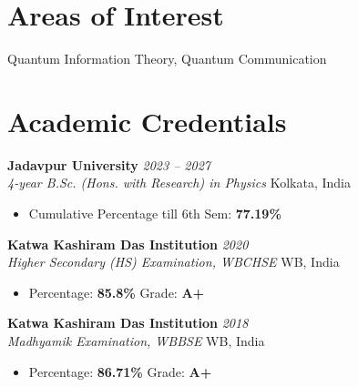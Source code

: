 \documentclass[11pt,a4paper]{article}
\newcommand{\entry}[4]{
    \textbf{#1} \hfill \textit{#2}\\
    \textit{#3} \hfill #4
    \vspace{3pt}
}
\begin{document}

\section{Areas of Interest}

Quantum Information Theory, Quantum Communication



\section{Academic Credentials}

\entry
{Jadavpur University}
{2023 -- 2027}
{4-year B.Sc. (Hons. with Research) in Physics}
{Kolkata, India}

\begin{itemize}
    \item Cumulative Percentage till 6th Sem: \textbf{77.19\%} \hspace{5pt}
\end{itemize}

\vspace{2pt}

\entry
{Katwa Kashiram Das Institution}
{2020}
{Higher Secondary (HS) Examination, WBCHSE}
{WB, India}

\begin{itemize}
    \item Percentage: \textbf{85.8\%} \hspace{5pt} Grade: \textbf{A+}
\end{itemize}

\vspace{2pt}

\entry
{Katwa Kashiram Das Institution}
{2018}
{Madhyamik Examination, WBBSE}
{WB, India}

\begin{itemize}
    \item Percentage: \textbf{86.71\%} \hspace{5pt} Grade: \textbf{A+}
\end{itemize}


\end{document}
